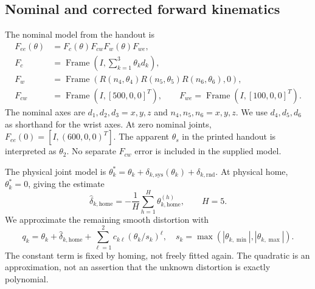 \documentclass[11pt]{article}
\newcommand{\Frame}{\operatorname{Frame}}
\begin{document}
\subsection{Nominal and corrected forward kinematics}
The nominal model from the handout is \cite{handout}
\begin{align}
 F_{ee}(\theta)&=F_c(\theta)F_{cw}F_w(\theta)F_{we},\\
 F_c&=\Frame\left(I,\sum_{k=1}^3\theta_kd_k\right),\\
 F_w&=\Frame\left(R(n_4,\theta_4)R(n_5,\theta_5)R(n_6,\theta_6),0\right),\\
 F_{cw}&=\Frame(I,[500,0,0]^T),\qquad
 F_{we}=\Frame(I,[100,0,0]^T).
\end{align}
The nominal axes are $d_1,d_2,d_3=x,y,z$ and $n_4,n_5,n_6=x,y,z$. We use $d_4,d_5,d_6$ as shorthand for the wrist axes. At zero nominal joints, $F_{ee}(0)=[I,(600,0,0)^T]$. The apparent $\theta_s$ in the printed handout is interpreted as $\theta_2$. No separate $F_{cw}$ error is included in the supplied model.

The physical joint model is $\theta_k^*=\theta_k+\delta_{k,\mathrm{sys}}(\theta_k)+\delta_{k,\mathrm{rnd}}$. At physical home, $\theta_k^*=0$, giving the estimate
\begin{equation}
 \widehat\delta_{k,\mathrm{home}}=-\frac1H\sum_{h=1}^H\theta_{k,\mathrm{home}}^{(h)},\qquad H=5.
 \label{eq:home}
\end{equation}
We approximate the remaining smooth distortion with
\begin{equation}
 q_k=\theta_k+\widehat\delta_{k,\mathrm{home}}+
 \sum_{\ell=1}^{2}c_{k\ell}(\theta_k/s_k)^\ell,
 \quad s_k=\max(|\theta_{k,\min}|,|\theta_{k,\max}|).
 \label{eq:q}
\end{equation}
The constant term is fixed by homing, not freely fitted again. The quadratic is an approximation, not an assertion that the unknown distortion is exactly polynomial.
\end{document}
